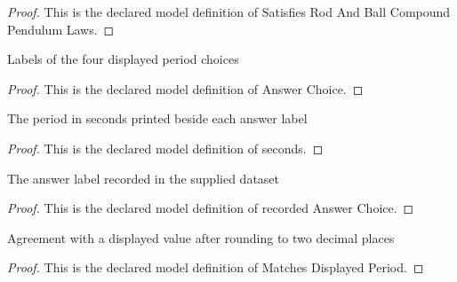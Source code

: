 \begin{proof}
  This is the declared model definition of Satisfies Rod And Ball Compound Pendulum Laws.
\end{proof}
\begin{definition}
  \label{def:physics:phyx-mini-0229:phyxminiproblems-problemphyxmini0229-answerchoice}
  Labels of the four displayed period choices
\end{definition}
\begin{proof}
  This is the declared model definition of Answer Choice.
\end{proof}
\begin{definition}[seconds]
  \label{def:physics:phyx-mini-0229:phyxminiproblems-problemphyxmini0229-answerchoice-seconds}
  The period in seconds printed beside each answer label
\end{definition}
\begin{proof}
  This is the declared model definition of seconds.
\end{proof}
\begin{definition}
  \label{def:physics:phyx-mini-0229:phyxminiproblems-problemphyxmini0229-recordedanswerchoice}
  The answer label recorded in the supplied dataset
\end{definition}
\begin{proof}
  This is the declared model definition of recorded Answer Choice.
\end{proof}
\begin{definition}
  \label{def:physics:phyx-mini-0229:phyxminiproblems-problemphyxmini0229-matchesdisplayedperiod}
  Agreement with a displayed value after rounding to two decimal places
\end{definition}
\begin{proof}
  This is the declared model definition of Matches Displayed Period.
\end{proof}

